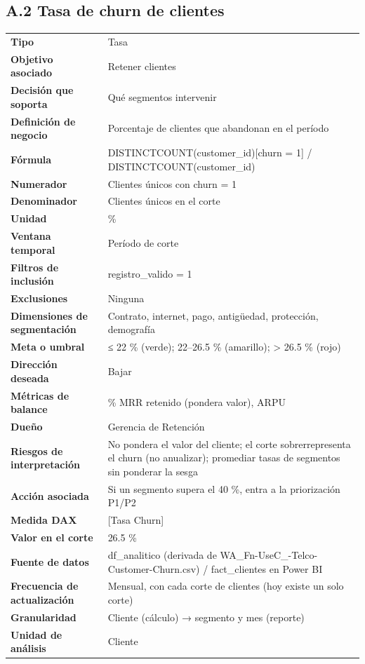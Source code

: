 \subsection*{A.2 Tasa de churn de clientes}
\begin{footnotesize}
\begin{longtable}{@{}p{}p{}@{}}
\toprule
\textbf{Tipo} & Tasa \\
\textbf{Objetivo asociado} & Retener clientes \\
\textbf{Decisión que soporta} & Qué segmentos intervenir \\
\textbf{Definición de negocio} & Porcentaje de clientes que abandonan en el período \\
\textbf{Fórmula} & DISTINCTCOUNT(customer\_id)[churn = 1] / DISTINCTCOUNT(customer\_id) \\
\textbf{Numerador} & Clientes únicos con churn = 1 \\
\textbf{Denominador} & Clientes únicos en el corte \\
\textbf{Unidad} & \% \\
\textbf{Ventana temporal} & Período de corte \\
\textbf{Filtros de inclusión} & registro\_valido = 1 \\
\textbf{Exclusiones} & Ninguna \\
\textbf{Dimensiones de segmentación} & Contrato, internet, pago, antigüedad, protección, demografía \\
\textbf{Meta o umbral} & ≤ 22 \% (verde); 22–26.5 \% (amarillo); > 26.5 \% (rojo) \\
\textbf{Dirección deseada} & Bajar \\
\textbf{Métricas de balance} & \% MRR retenido (pondera valor), ARPU \\
\textbf{Dueño} & Gerencia de Retención \\
\textbf{Riesgos de interpretación} & No pondera el valor del cliente; el corte sobrerrepresenta el churn (no anualizar); promediar tasas de segmentos sin ponderar la sesga \\
\textbf{Acción asociada} & Si un segmento supera el 40 \%, entra a la priorización P1/P2 \\
\textbf{Medida DAX} & [Tasa Churn] \\
\textbf{Valor en el corte} & 26.5 \% \\
\textbf{Fuente de datos} & df\_analitico (derivada de WA\_Fn-UseC\_-Telco-Customer-Churn.csv) / fact\_clientes en Power BI \\
\textbf{Frecuencia de actualización} & Mensual, con cada corte de clientes (hoy existe un solo corte) \\
\textbf{Granularidad} & Cliente (cálculo) → segmento y mes (reporte) \\
\textbf{Unidad de análisis} & Cliente \\
\bottomrule
\end{longtable}
\end{footnotesize}

